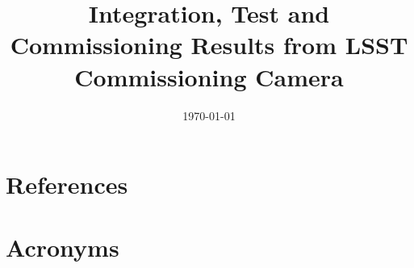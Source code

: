 \documentclass[modern]{aastex62}
\begin{document}

\date{\today}
\title{Integration, Test and Commissioning Results from LSST Commissioning Camera}






\appendix

\section{References} \label{sec:bib}



\section{Acronyms} \label{sec:acronyms}

\end{document}
